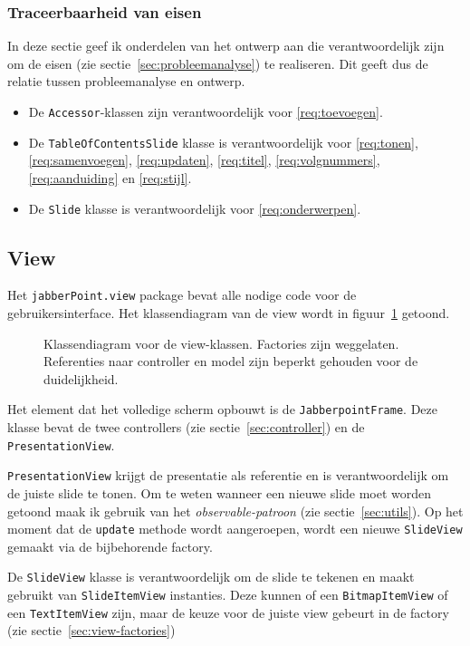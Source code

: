 \documentclass[a4paper]{article}
\newcommand{\reqref}[1]{\ref{req:#1}}
\newcommand{\code}[1]{\lstinline[columns=fixed]{#1}}
\newcommand{\diagram}[3][1.3]{
	\begin{figure}[!htb]
	 \caption{#3}
	 \label{diagram:#2}
	 \makebox[\textwidth][c]{\texttt{[image: Diagrams/\#2.pdf]}}%
	\end{figure}
}
\begin{document}
		\subsubsection{Traceerbaarheid van eisen}
			In deze sectie geef ik onderdelen van het ontwerp aan die verantwoordelijk zijn om de eisen (zie sectie~\ref{sec:probleemanalyse}) te realiseren.
			Dit geeft dus de relatie tussen probleemanalyse en ontwerp.

			\begin{itemize}
				\item De \code{Accessor}-klassen zijn verantwoordelijk voor \reqref{toevoegen}.
				\item De \code{TableOfContentsSlide} klasse is verantwoordelijk voor \reqref{tonen}, \reqref{samenvoegen},
					\reqref{updaten}, \reqref{titel}, \reqref{volgnummers}, \reqref{aanduiding} en \reqref{stijl}.
				\item De \code{Slide} klasse is verantwoordelijk voor \reqref{onderwerpen}.
			\end{itemize}

	\subsection{View}\label{sec:view}
		Het \code{jabberPoint.view} package bevat alle nodige code voor de gebruikersinterface.
		Het klassendiagram van de view wordt in figuur~\ref{diagram:view} getoond.

		\diagram{view}{
			Klassendiagram voor de view-klassen.
			Factories zijn weggelaten.
			Referenties naar controller en model zijn beperkt gehouden voor de duidelijkheid.
		}

		Het element dat het volledige scherm opbouwt is de \code{JabberpointFrame}.
		Deze klasse bevat de twee controllers (zie sectie~\ref{sec:controller}) en de \code{PresentationView}.

		\code{PresentationView} krijgt de presentatie als referentie en is verantwoordelijk om de juiste slide te tonen.
		Om te weten wanneer een nieuwe slide moet worden getoond maak ik gebruik van het \textit{observable-patroon} (zie sectie~\ref{sec:utils}).
		Op het moment dat de \code{update} methode wordt aangeroepen, wordt een nieuwe \code{SlideView} gemaakt via de bijbehorende factory.

		De \code{SlideView} klasse is verantwoordelijk om de slide te tekenen en maakt gebruikt van \code{SlideItemView} instanties.
		Deze kunnen of een \code{BitmapItemView} of een \code{TextItemView} zijn, maar de keuze voor de juiste view gebeurt in de factory (zie sectie~\ref{sec:view-factories})
\end{document}
